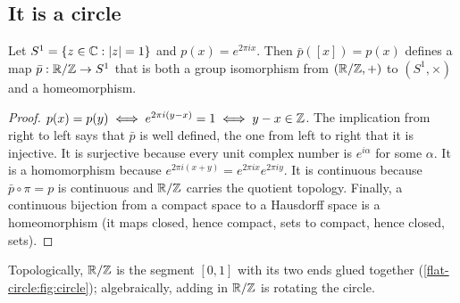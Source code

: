 \begin{notechapter}
\section{It is a circle}

\begin{proposition}\label{flat-circle:prop:circle}
Let $S^1 = \{z\in\mathbb C : \left|z\right| = 1\}$ and $p(x) = e^{2\pi ix}$. Then $\bar p([x]) = p(x)$ defines a map
$\bar p:\mathbb{R}/\mathbb{Z}\to S^1$ that is both a group isomorphism from $(\mathbb{R}/\mathbb{Z}, +)$ to $(S^1, \times)$ and a homeomorphism.
\end{proposition}

\begin{proof}
$p(x) = p(y)\iff e^{2\pi i(y - x)} = 1\iff y - x\in\mathbb{Z}$. The implication from right to left says that $\bar p$ is well
defined, the one from left to right that it is injective. It is surjective because every unit
complex number is $e^{i\alpha}$ for some $\alpha$. It is a homomorphism because
$e^{2\pi i(x + y)} = e^{2\pi ix}e^{2\pi iy}$. It is continuous because $\bar p\circ\pi = p$ is continuous and $\mathbb{R}/\mathbb{Z}$ carries the
quotient topology. Finally, a continuous bijection from a compact space to a Hausdorff space is a
homeomorphism (it maps closed, hence compact, sets to compact, hence closed, sets).
\end{proof}

Topologically, $\mathbb{R}/\mathbb{Z}$ is the segment $[0, 1]$ with its two ends glued together
(\cref{flat-circle:fig:circle}); algebraically, adding in $\mathbb{R}/\mathbb{Z}$ is rotating the circle.


\end{notechapter}
